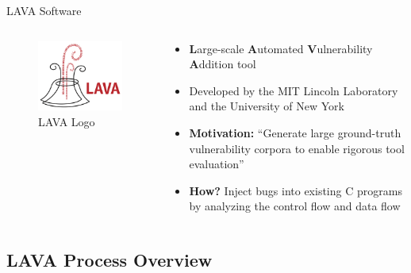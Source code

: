 \documentclass[aspectratio=169]{beamer}
\begin{document}
  \begin{frame}{LAVA Software}
    \begin{columns}
      \begin{column}{0.25\textwidth}
        \begin{figure}
          \centering
          \hspace{1em}
          \includegraphics[scale=0.35]{figures/lava-logo}
          \caption{LAVA Logo}
        \end{figure}
      \end{column}
      \begin{column}{0.75\textwidth}
        \begin{itemize}
        \setlength\itemsep{1em}
        \item \textbf{L}arge-scale \textbf{A}utomated \textbf{V}ulnerability \textbf{A}ddition tool
        \item Developed by the MIT Lincoln Laboratory and the University of New York
        \item \textbf{Motivation:} ``Generate \alert{large ground-truth vulnerability corpora} to enable rigorous tool evaluation''
        \item \textbf{How?} Inject bugs into existing C programs by analyzing the \alert{control flow} and \alert{data flow}
        \end{itemize}
      \end{column}
    \end{columns}
  \end{frame}
  
  \subsection{LAVA Process Overview}
\end{document}
